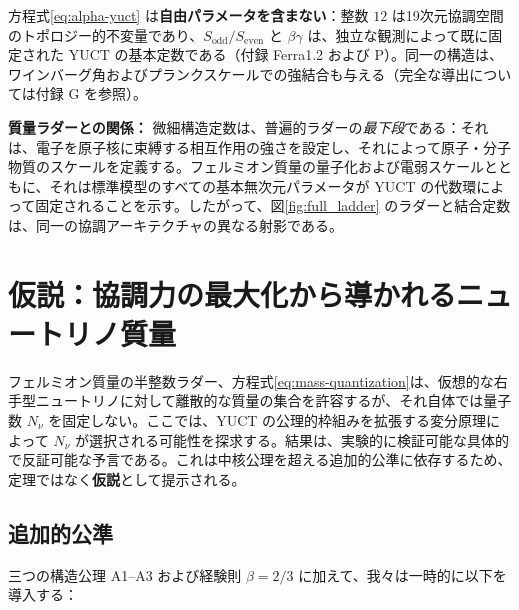 \documentclass[12pt,a4paper]{article}
\begin{document}
	方程式\eqref{eq:alpha-yuct} は\textbf{自由パラメータを含まない}：整数 \(12\) は19次元協調空間のトポロジー的不変量であり、\(S_{\mathrm{odd}}/S_{\mathrm{even}}\) と \(\beta\gamma\) は、独立な観測によって既に固定された YUCT の基本定数である（付録 Ferra1.2 および P）。同一の構造は、ワインバーグ角およびプランクスケールでの強結合も与える（完全な導出については付録 G を参照）。
	
	\textbf{質量ラダーとの関係：} 微細構造定数は、普遍的ラダーの\textit{最下段}である：それは、電子を原子核に束縛する相互作用の強さを設定し、それによって原子・分子物質のスケールを定義する。フェルミオン質量の量子化および電弱スケールとともに、それは標準模型のすべての基本無次元パラメータが YUCT の代数環によって固定されることを示す。したがって、図\ref{fig:full_ladder} のラダーと結合定数は、同一の協調アーキテクチャの異なる射影である。
	
	\section{仮説：協調力の最大化から導かれるニュートリノ質量}
	\label{sec:neutrino-hypothesis}
	
	フェルミオン質量の半整数ラダー、方程式\eqref{eq:mass-quantization}は、仮想的な右手型ニュートリノに対して離散的な質量の集合を許容するが、それ自体では量子数 \(N_{\nu}\) を固定しない。ここでは、YUCT の公理的枠組みを拡張する変分原理によって \(N_{\nu}\) が選択される可能性を探求する。結果は、実験的に検証可能な具体的で反証可能な予言である。これは中核公理を超える追加的公準に依存するため、定理ではなく\textbf{仮説}として提示される。
	
	\subsection{追加的公準}
	
	三つの構造公理 A1--A3 および経験則 \(\beta=2/3\) に加えて、我々は一時的に以下を導入する：
	
\end{document}
